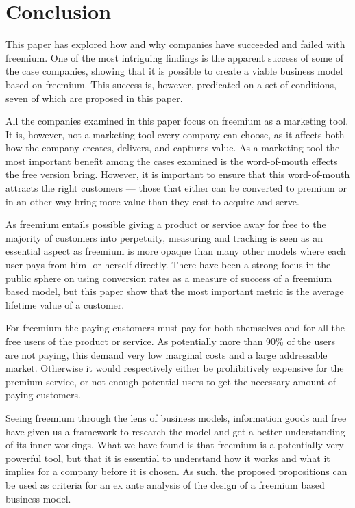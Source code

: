 \chapter{Conclusion}
\label{chapter:conclusion}

This paper has explored how and why companies have succeeded and failed with freemium. One of the most intriguing findings is the apparent success of some of the case companies, showing that it is possible to create a viable business model based on freemium. This success is, however, predicated on a set of conditions, seven of which are proposed in this paper.

All the companies examined in this paper focus on freemium as a marketing tool. It is, however, not a marketing tool every company can choose, as it affects both how the company creates, delivers, and captures value. As a marketing tool the most important benefit among the cases examined is the word-of-mouth effects the free version bring. However, it is important to ensure that this word-of-mouth attracts the right customers --- those that either can be converted to premium or in an other way bring more value than they cost to acquire and serve. 

As freemium entails possible giving a product or service away for free to the majority of customers into perpetuity, measuring and tracking is seen as an essential aspect as freemium is more opaque than many other models where each user pays from him- or herself directly. There have been a strong focus in the public sphere on using conversion rates as a measure of success of a freemium based model, but this paper show that the most important metric is the average lifetime value of a customer. 

For freemium the paying customers must pay for both themselves and for all the free users of the product or service. As potentially more than 90\% of the users are not paying, this demand very low marginal costs and a large addressable market. Otherwise it would respectively either be prohibitively expensive for the premium service, or not enough potential users to get the necessary amount of paying customers.

Seeing freemium through the lens of business models, information goods and free have given us a framework to research the model and get a better understanding of its inner workings. What we have found is that freemium is a potentially very powerful tool, but that it is essential to understand how it works and what it implies for a company before it is chosen. As such, the proposed propositions can be used as criteria for an ex ante analysis of the design of a freemium based business model.

